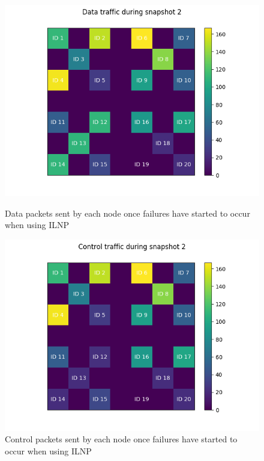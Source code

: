 \documentclass[12pt]{article}
\begin{document}
\begin{figure}[!ht]
    \centering
    \begin{minipage}{0.45\textwidth}
        \centering
        \includegraphics[width=\textwidth]{images/ilnp/snapshot2-Data.png} %
        \caption{Data packets sent by each node once failures have started to occur when using ILNP}
        \label{fig:datasnapthree}
    \end{minipage}\hfill
    \begin{minipage}{0.45\textwidth}
        \centering
        \includegraphics[width=\textwidth]{images/ilnp/snapshot2-Control.png} %
        \caption{Control packets sent by each node once failures have started to occur when using ILNP}
        \label{fig:ctrlsnapthree}
    \end{minipage}
\end{figure}
\end{document}
